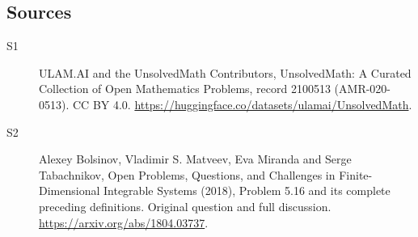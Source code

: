 \documentclass[11pt]{article}
\begin{document}
\subsection{Sources}
\begin{description}
\item[\hypertarget{source:2100513:1}{S1}] ULAM.AI and the UnsolvedMath Contributors, UnsolvedMath: A Curated Collection of Open Mathematics Problems, record 2100513 (AMR-020-0513). CC BY 4.0. \url{https://huggingface.co/datasets/ulamai/UnsolvedMath}.
\item[\hypertarget{source:2100513:2}{S2}] Alexey Bolsinov, Vladimir S. Matveev, Eva Miranda and Serge Tabachnikov, Open Problems, Questions, and Challenges in Finite-Dimensional Integrable Systems (2018), Problem 5.16 and its complete preceding definitions. Original question and full discussion. \url{https://arxiv.org/abs/1804.03737}.

\end{description}
\label{end:2100513}
\end{document}
